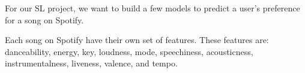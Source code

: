 For our SL project, we want to build a few models to predict a user's preference for a song on Spotify. 

Each song on Spotify have their own set of features. These features are: danceability, energy, key, loudness,
mode, speechiness, acousticness, instrumentalness, liveness, valence, and tempo.
